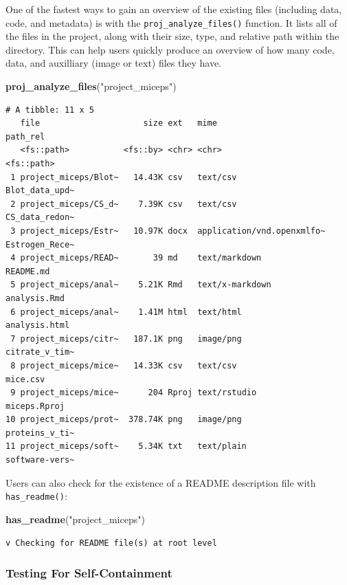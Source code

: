 \documentclass[12pt,twoside]{reedthesis}
\newenvironment{Shaded}{\begin{snugshade}}{\end{snugshade}}
\newcommand{\KeywordTok}[1]{\textcolor[rgb]{0.13,0.29,0.53}{\textbf{#1}}}
\newcommand{\NormalTok}[1]{#1}
\newcommand{\StringTok}[1]{\textcolor[rgb]{0.31,0.60,0.02}{#1}}
\begin{document}
One of the fastest ways to gain an overview of the existing files (including data, code, and metadata) is with the \texttt{proj\_analyze\_files()} function. It lists all of the files in the project, along with their size, type, and relative path within the directory. This can help users quickly produce an overview of how many code, data, and auxilliary (image or text) files they have.
\begin{Shaded}
\begin{Highlighting}[]
\KeywordTok{proj_analyze_files}\NormalTok{(}\StringTok{"project_miceps"}\NormalTok{)}
\end{Highlighting}
\end{Shaded}
\begin{verbatim}
# A tibble: 11 x 5
   file                     size ext   mime                       path_rel      
   <fs::path>           <fs::by> <chr> <chr>                      <fs::path>    
 1 project_miceps/Blot~   14.43K csv   text/csv                   Blot_data_upd~
 2 project_miceps/CS_d~    7.39K csv   text/csv                   CS_data_redon~
 3 project_miceps/Estr~   10.97K docx  application/vnd.openxmlfo~ Estrogen_Rece~
 4 project_miceps/READ~       39 md    text/markdown              README.md     
 5 project_miceps/anal~    5.21K Rmd   text/x-markdown            analysis.Rmd  
 6 project_miceps/anal~    1.41M html  text/html                  analysis.html 
 7 project_miceps/citr~   187.1K png   image/png                  citrate_v_tim~
 8 project_miceps/mice~   14.33K csv   text/csv                   mice.csv      
 9 project_miceps/mice~      204 Rproj text/rstudio               miceps.Rproj  
10 project_miceps/prot~  378.74K png   image/png                  proteins_v_ti~
11 project_miceps/soft~    5.34K txt   text/plain                 software-vers~
\end{verbatim}
Users can also check for the existence of a README description file with \texttt{has\_readme()}:
\begin{Shaded}
\begin{Highlighting}[]
\KeywordTok{has_readme}\NormalTok{(}\StringTok{"project_miceps"}\NormalTok{)}
\end{Highlighting}
\end{Shaded}
\begin{verbatim}
v Checking for README file(s) at root level
\end{verbatim}
\hypertarget{testing-for-self-containment}{%
\subsubsection{Testing For Self-Containment}\label{testing-for-self-containment}}
\end{document}
